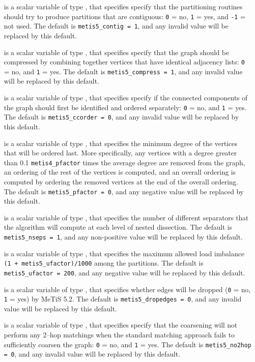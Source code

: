 \documentclass{galahad}
\begin{document}
\begin{description}
 is a scalar variable of type \integer, that specifies
specify that the partitioning routines should try to produce partitions 
that are contiguous: {\tt 0} = no, {\tt 1} = yes, and {\tt -1} = not used.
The default is {\tt metis5\_contig = 1}, and any invalid value will be
replaced by this default.

 is a scalar variable of type \integer, that specifies
specify that the graph should be compressed by combining together vertices 
that have identical adjacency lists: {\tt 0} = no, and {\tt 1} = yes.
The default is {\tt metis5\_compress = 1}, and any invalid value will be
replaced by this default.

 is a scalar variable of type \integer, that specifies
specify if the connected components of the graph should first be
identified and ordered separately: {\tt 0} = no, and {\tt 1} = yes.
The default is {\tt metis5\_ccorder = 0}, and any invalid value will be
replaced by this default.

 is a scalar variable of type \integer, that specifies
the minimum degree of the vertices that will be ordered last.
More specifically, any vertices with a degree greater than 
0.1 {\tt metis4\_pfactor} times the average degree are removed from
the graph, an ordering of the rest of the vertices is computed, and an
overall ordering is computed by ordering the removed vertices at the end
of the overall ordering. The default is {\tt metis5\_pfactor = 0}, and any 
negative value will be replaced by this default.

 is a scalar variable of type \integer, that specifies
the number of different separators that the algorithm will compute
at each level of nested dissection.
The default is {\tt metis5\_nseps = 1}, and any non-positive value will be
replaced by this default.

 is a scalar variable of type \integer, that specifies
the maximum allowed load imbalance {\tt (1 +  metis5\_ufactor)/1000} 
among the partitions.
The default is {\tt metis5\_ufactor = 200}, and any negative value will be
replaced by this default.

 is a scalar variable of type \integer, that specifies
whether edges will be dropped ({\tt 0} = no, {\tt 1} = yes) by MeTiS 5.2.
The default is {\tt metis5\_dropedges = 0}, and any invalid value will be
replaced by this default.

 is a scalar variable of type \integer, that specifies
specify that the coarsening will not perform any 2–hop matchings when 
the standard matching approach fails to sufficiently coarsen the graph:
{\tt 0} = no, and {\tt 1} = yes.
The default is {\tt metis5\_no2hop = 0}, and any invalid value will be
replaced by this default.


\end{description}
\end{document}
